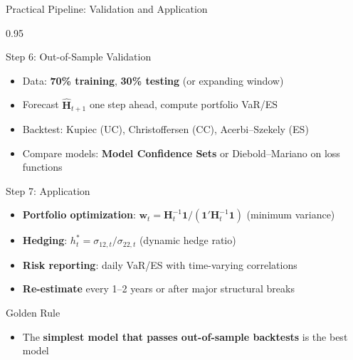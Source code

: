 \documentclass[9pt, aspectratio=169, t]{beamer}
\begin{document}
\begin{frame}{Practical Pipeline: Validation and Application}
    \begin{cminipage}{0.95\textwidth}
    \vspace{-2mm}
    {\scriptsize
    \begin{block}{Step 6: Out-of-Sample Validation}
        \begin{itemize}\setlength{\itemsep}{0pt}
            \item Data: \textbf{70\% training}, \textbf{30\% testing} (or expanding window)
            \item Forecast $\hat{\mathbf{H}}_{t+1}$ one step ahead, compute portfolio VaR/ES
            \item Backtest: Kupiec (UC), Christoffersen (CC), Acerbi--Szekely (ES)
            \item Compare models: \textbf{Model Confidence Sets} or Diebold--Mariano on loss functions
        \end{itemize}
    \end{block}
    \vspace{-1mm}
    \begin{block}{Step 7: Application}
        \begin{itemize}\setlength{\itemsep}{0pt}
            \item \textbf{Portfolio optimization}: $\mathbf{w}_t = \mathbf{H}_t^{-1}\mathbf{1} / (\mathbf{1}'\mathbf{H}_t^{-1}\mathbf{1})$ (minimum variance)
            \item \textbf{Hedging}: $h_t^* = \sigma_{12,t}/\sigma_{22,t}$ (dynamic hedge ratio)
            \item \textbf{Risk reporting}: daily VaR/ES with time-varying correlations
            \item \textbf{Re-estimate} every 1--2 years or after major structural breaks
        \end{itemize}
    \end{block}
    \vspace{-1mm}
    \begin{alertblock}{Golden Rule}
        \begin{itemize}\setlength{\itemsep}{0pt}
            \item The \textbf{simplest model that passes out-of-sample backtests} is the best model
        \end{itemize}
    \end{alertblock}
    }
    \end{cminipage}
\end{frame}
\end{document}
